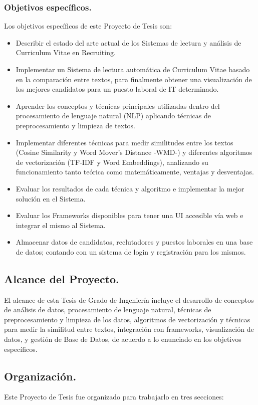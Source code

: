 \documentclass[12pt,a4paper]{article}
\begin{document}
\subsubsection{Objetivos específicos.}
Los objetivos específicos de este Proyecto de Tesis son:
\begin{itemize}
\item Describir el estado del arte actual de los Sistemas de lectura y análisis de Curriculum Vitae en Recruiting. 
\item Implementar un Sistema de lectura automática de Curriculum Vitae basado en la comparación entre textos, para finalmente obtener una visualización de los mejores candidatos para un puesto laboral de IT determinado.  
\item Aprender los conceptos y técnicas principales utilizadas dentro del procesamiento de lenguaje natural (NLP) aplicando técnicas de preprocesamiento y limpieza de textos.
\item Implementar diferentes técnicas para medir similitudes entre los textos (Cosine Similarity y  Word Mover's Distance -WMD-) y diferentes algoritmos de vectorización (TF-IDF y Word Embeddings), analizando su funcionamiento tanto teórica como matemáticamente, ventajas y desventajas.
\item Evaluar los resultados de cada técnica y algoritmo e implementar la mejor solución en el Sistema.
\item Evaluar los Frameworks disponibles para tener una UI accesible vía web e integrar el mismo al Sistema.
\item Almacenar datos de candidatos, reclutadores y puestos laborales en una base de datos; contando con un sistema de login y registración para los mismos.
\end{itemize} 

\cleardoublepage    %

\subsection{Alcance del Proyecto.}
El alcance de esta Tesis de Grado de Ingeniería incluye el desarrollo de conceptos de análisis de datos, procesamiento de lenguaje natural, técnicas de preprocesamiento y limpieza de los datos, algoritmos de vectorización y técnicas para medir la similitud entre textos, integración con frameworks, visualización de datos, y gestión de Base de Datos, de acuerdo a lo enunciado en los objetivos específicos.

\subsection{Organización.}
Este Proyecto de Tesis fue organizado para trabajarlo en tres secciones:
\end{document}
